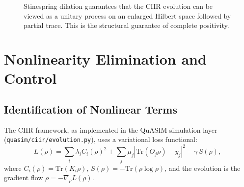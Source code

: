\begin{figure}[t]
\centering
{}
\caption{Stinespring dilation guarantees that the CIIR evolution can be
viewed as a unitary process on an enlarged Hilbert space followed by
partial trace.  This is the structural guarantee of complete positivity.}
\label{fig:c9:stinespring}
\end{figure}


\section{Nonlinearity Elimination and Control}
\label{sec:c9:nonlinearity}

\subsection{Identification of Nonlinear Terms}

The CIIR framework, as implemented in the QuASIM simulation layer
(\texttt{quasim/ciir/evolution.py}), uses a variational loss functional:
\begin{equation}
  L(\rho) = \sum_i \lambda_i C_i(\rho)^2
    + \sum_j \mu_j |\mathrm{Tr}(O_j \rho) - y_j|^2
    - \gamma\, S(\rho),
  \label{eq:c9:loss}
\end{equation}
where $C_i(\rho) = \mathrm{Tr}(K_i \rho)$, $S(\rho) = -\mathrm{Tr}(\rho
\log\rho)$, and the evolution is the gradient flow
$\dot{\rho} = -\nabla_\rho L(\rho)$.

